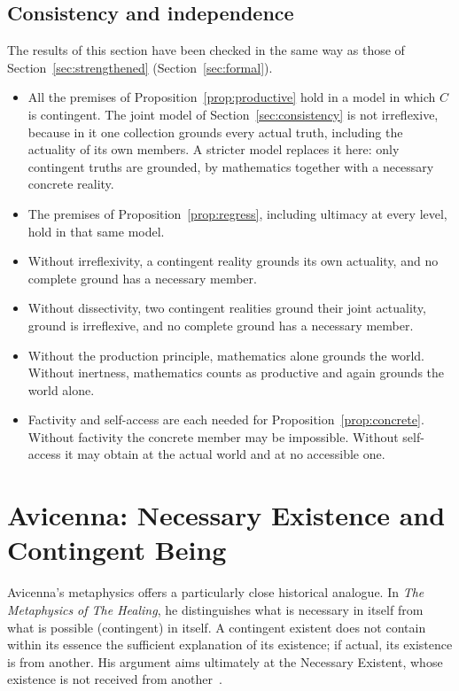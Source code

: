 \documentclass[11pt,letterpaper]{article}
\theoremstyle{plain}
\theoremstyle{definition}
\begin{document}
\subsection{Consistency and independence}
\label{sec:derivedmodels}

The results of this section have been checked in the same way as those of Section~\ref{sec:strengthened} (Section~\ref{sec:formal}).
\begin{itemize}
  \item All the premises of Proposition~\ref{prop:productive} hold in a model in which $C$ is contingent. The joint model of Section~\ref{sec:consistency} is not irreflexive, because in it one collection grounds every actual truth, including the actuality of its own members. A stricter model replaces it here: only contingent truths are grounded, by mathematics together with a necessary concrete reality.
  \item The premises of Proposition~\ref{prop:regress}, including ultimacy at every level, hold in that same model.
  \item Without irreflexivity, a contingent reality grounds its own actuality, and no complete ground has a necessary member.
  \item Without dissectivity, two contingent realities ground their joint actuality, ground is irreflexive, and no complete ground has a necessary member.
  \item Without the production principle, mathematics alone grounds the world. Without inertness, mathematics counts as productive and again grounds the world alone.
  \item Factivity and self-access are each needed for Proposition~\ref{prop:concrete}. Without factivity the concrete member may be impossible. Without self-access it may obtain at the actual world and at no accessible one.
\end{itemize}

\section{Avicenna: Necessary Existence and Contingent Being}

Avicenna's metaphysics offers a particularly close historical analogue. In \emph{The Metaphysics of The Healing}, he distinguishes what is necessary in itself from what is possible (contingent) in itself. A contingent existent does not contain within its essence the sufficient explanation of its existence; if actual, its existence is from another. His argument aims ultimately at the Necessary Existent, whose existence is not received from another~\cite{avicenna,adamson,chignell}.
\end{document}
